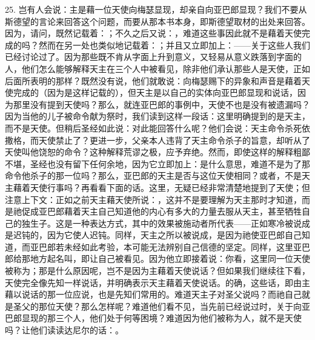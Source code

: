 25. 岂有人会说：主是藉一位天使向梅瑟显现，却亲自向亚巴郎显现？我们不要从斯德望的言论来回答这个问题，而要从那本书本身，即斯德望取材的出处来回答。因为，请问，既然记载着：；不久之后又说：，难道这些事因此就不是藉着天使完成的吗？\newline{}然而在另一处也类似地记载着：；并且又立即加上：——关于这些人我们已经讨论过了。因为那些既不肯从字面上升到意义，又轻易从意义跌落到字面的人，他们怎么能够解释天主在三个人中被看见，除非他们承认那些人是天使，正如后面所表明的那样？既然没有说，他们就敢说：向梅瑟赐下的异象和声音是藉着天使完成的（因为是这样记载的），但天主是以自己的实体向亚巴郎显现和说话，因为那里没有提到天使吗？\newline{}那么，就连亚巴郎的事例中，天使不也是没有被遗漏吗？因为当他的儿子被命令献为祭时，我们读到这样一段话：这里明确提到的是天主，而不是天使。但稍后圣经如此说：对此能回答什么呢？他们会说：天主命令杀死依撒格，而天使禁止了？更进一步，父亲本人违背了天主命令杀子的旨意，却听从了天使叫他饶恕的命令？这种解释荒谬之极，应予弃绝。然而，即使这样的解释粗鄙不堪，圣经也没有留下任何余地，因为它立即加上：是什么意思，难道不是为了那命令他杀子的那一位吗？那么，亚巴郎的天主是否与这位天使相同？或者，不是天主藉着天使行事吗？再看看下面的话。这里，无疑已经非常清楚地提到了天使；但注意上下文：正如之前天主藉天使所说：，这并不是要理解为天主那时才知道，而是祂促成亚巴郎藉着天主自己知道他的内心有多大的力量去服从天主，甚至牺牲自己的独生子。这是一种表达方式，其中的效果被施动者所代表——正如寒冷被说成是迟钝的，因为它使人迟钝。同样，天主之所以被说成，是因为祂使亚巴郎自己知道，而亚巴郎若未经如此考验，本可能无法辨别自己信德的坚定。同样，这里亚巴郎给那地方起名叫，即让自己被看见。因为他立即接着说：你看，这里同一位天使被称为；那是什么原因呢，岂不是因为主藉着天使说话？但如果我们继续往下看，天使完全像先知一样说话，并明确表示天主藉着天使说话。的确，这些话，即由主藉以说话的那一位应说，也是先知们常用的。难道天主子对圣父说吗？而祂自己就是圣父的那位天使？那么怎样呢？难道他们看不见，当先前已经说过时，关于向亚巴郎显现的那三个人，他们处于何等困境？难道因为他们被称为人，就不是天使吗？让他们读读达尼尔的话：。\par


